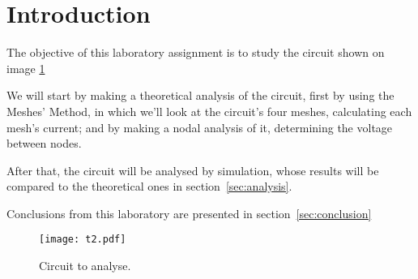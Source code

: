 \section{Introduction}

The objective of this laboratory assignment is to study the circuit shown on image \ref{Fig1: circuit}

We will start by making a theoretical analysis of the circuit, first by  using the Meshes' Method, in which we’ll look at the circuit’s four meshes, calculating each mesh’s current; and by making a nodal analysis of it, determining the voltage between nodes.

After that, the circuit will be analysed by simulation, whose results will be compared to the theoretical ones in section~\ref{sec:analysis}.

Conclusions from this laboratory are presented in section~\ref{sec:conclusion}

\begin{figure}[h] \centering
\texttt{[image: t2.pdf]}
\caption{Circuit to analyse.}
\label{Fig1: circuit}
\end{figure}
